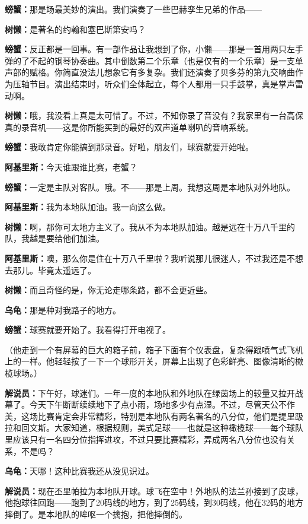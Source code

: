 \documentclass[
  12pt,
  twoside,
  openright,
  oldfontcommands,
]{memoir}
\newcommand{\dialogname}[1]{{\heifamily\bfseries #1}}
\begin{document}
\dialogname{螃蟹：}那是场最美妙的演出。我们演奏了一些巴赫孪生兄弟的作品------

\dialogname{树懒：}是著名的约翰和塞巴斯第安吗？

\dialogname{螃蟹：}反正都是一回事。有一部作品让我想到了你，小懒------那是一首用两只左手弹的了不起的钢琴协奏曲。其中倒数第二个乐章（也是仅有的一个乐章）是一支单声部的赋格。你简直没法儿想象它有多复杂。我们还演奏了贝多芬的第九交响曲作为压轴节目。演出结束时，听众们全体起立，每个人都用一只手鼓掌，真是掌声雷动啊。

\dialogname{树懒：}哦，我没看上真是太可惜了。不过，不知你录了音没有？我家里有一台高保真的录音机------这是你所能买到的最好的双声道单喇叭的音响系统。

\dialogname{螃蟹：}我敢肯定你能搞到那录音。好啦，朋友们，球赛就要开始啦。

\dialogname{阿基里斯：}今天谁跟谁比赛，老蟹？

\dialogname{螃蟹：}一定是主队对客队。哦。不------那是上周。我想这周是本地队对外地队。

\dialogname{阿基里斯：}我为本地队加油。我一向这么做。

\dialogname{树懒：}啊，那你可太地方主义了。我从不为本地队加油。越是远在十万八千里的队，我越是要给他们加油。

\dialogname{阿基里斯：}噢，那么你是住在十万八千里啦？我听说那儿很迷人，不过我还是不想去那儿。毕竟太遥远了。

\dialogname{树懒：}而且奇怪的是，你无论走哪条路，都不会更近些。

\dialogname{乌龟：}那是种对我路子的地方。

\dialogname{螃蟹：}球赛就要开始了。我看得打开电视了。

（他走到一个有屏幕的巨大的箱子前，箱子下面有个仪表盘，复杂得跟喷气式飞机上的一样。他轻轻按了一下一个球形开关，屏幕上出现了色彩鲜亮、图像清晰的橄榄球场。）

\dialogname{解说员：}下午好，球迷们。一年一度的本地队和外地队在绿茵场上的较量又拉开战幕了。今天下午断断续续地下了点小雨，场地多少有点湿。不过，尽管天公不作美，这场比赛肯定会非常精彩，特别是本地队有两名著名的八分位，他们是提里趿拉和回文斯。大家知道，根据规则，美式足球------也就是这种橄榄球------每个球队里应该只有一名四分位指挥进攻，不过只要比赛精彩，弄成两名八分位也没有关系，不是吗？

\dialogname{乌龟：}天哪！这种比赛我还从没见识过。

\dialogname{解说员：}现在丕里帕拉为本地队开球。球飞在空中！外地队的法兰孙接到了皮球，他抱球往回跑------跑到了20码线的地方，到了25码线，到30码线，他在32码的地方摔倒了。是本地队的哞呕一个擒抱，把他摔倒的。
\end{document}
